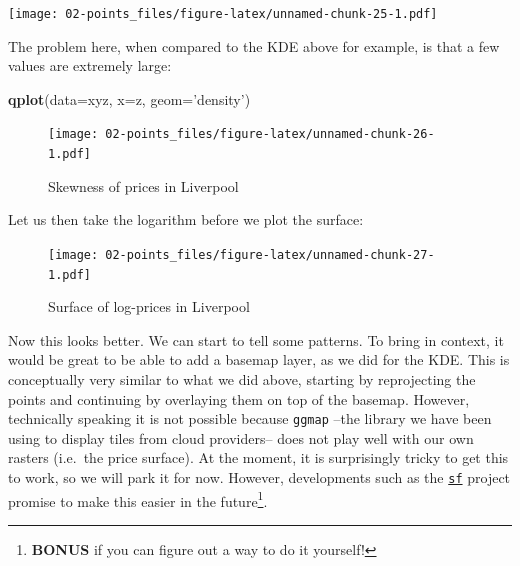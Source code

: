 \documentclass[]{book}
\newenvironment{Shaded}{\begin{snugshade}}{\end{snugshade}}
\newcommand{\KeywordTok}[1]{\textcolor[rgb]{0.13,0.29,0.53}{\textbf{#1}}}
\newcommand{\DataTypeTok}[1]{\textcolor[rgb]{0.13,0.29,0.53}{#1}}
\newcommand{\StringTok}[1]{\textcolor[rgb]{0.31,0.60,0.02}{#1}}
\newcommand{\OperatorTok}[1]{\textcolor[rgb]{0.81,0.36,0.00}{\textbf{#1}}}
\newcommand{\NormalTok}[1]{#1}
\begin{document}
\texttt{[image: 02-points\_files/figure-latex/unnamed-chunk-25-1.pdf]}

The problem here, when compared to the KDE above for example, is that a
few values are extremely large:

\begin{Shaded}
\begin{Highlighting}[]
\KeywordTok{qplot}\NormalTok{(}\DataTypeTok{data=}\NormalTok{xyz, }\DataTypeTok{x=}\NormalTok{z, }\DataTypeTok{geom=}\StringTok{'density'}\NormalTok{)}
\end{Highlighting}
\end{Shaded}

\begin{figure}
\centering
\texttt{[image: 02-points\_files/figure-latex/unnamed-chunk-26-1.pdf]}
\caption{\label{fig:unnamed-chunk-26}Skewness of prices in Liverpool}
\end{figure}

Let us then take the logarithm before we plot the surface:

\begin{Shaded}
\end{Shaded}

\begin{figure}
\centering
\texttt{[image: 02-points\_files/figure-latex/unnamed-chunk-27-1.pdf]}
\caption{\label{fig:unnamed-chunk-27}Surface of log-prices in Liverpool}
\end{figure}

Now this looks better. We can start to tell some patterns. To bring in
context, it would be great to be able to add a basemap layer, as we did
for the KDE. This is conceptually very similar to what we did above,
starting by reprojecting the points and continuing by overlaying them on
top of the basemap. However, technically speaking it is not possible
because \texttt{ggmap} --the library we have been using to display tiles
from cloud providers-- does not play well with our own rasters (i.e.~the
price surface). At the moment, it is surprisingly tricky to get this to
work, so we will park it for now. However, developments such as the
\href{https://github.com/edzer/sfr}{\texttt{sf}} project promise to make
this easier in the future\footnote{\textbf{BONUS} if you can figure out
  a way to do it yourself!}.
\end{document}
